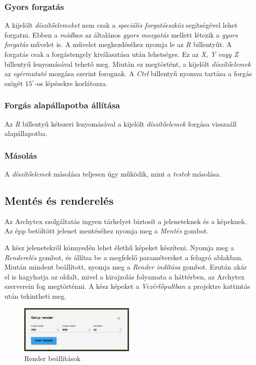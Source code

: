 \subsubsection{Gyors forgatás}

A kijelölt \emph{díszítőelemeket} nem csak a \emph{speciális forgatóeszköz} segítségével lehet
forgatni. Ebben a \emph{módban} az általános \emph{gyors mozgatás} mellett létezik a
\emph{gyors forgatás} művelet is. A művelet megkezdéséhez nyomja le az \emph{R} billentyűt.
A forgatás csak a forgástengely kiválasztása után lehetséges. Ez
az \emph{X, Y vagy Z} billentyű lenyomásával tehető meg. Miután ez megtörtént, a kijelölt
\emph{díszítőelemek} az \emph{egérmutató} mozgása szerint forognak. A \emph{Ctrl} billentyű
nyomva tartása a forgás szögét $15^{\circ}$-os lépésekre korlátozza.

\subsubsection{Forgás alapállapotba állítása}

Az \emph{R} billentyű kétszeri lenyomásával a kijelölt \emph{díszítőelemek} forgása visszaáll
alapállapotba.

\subsubsection{Másolás}

A \emph{díszítőelemek} másolása teljesen úgy működik, mint a \emph{testek} másolása.

\subsection{Mentés és renderelés}

Az Archytex szolgáltatás ingyen tárhelyet biztosít a jeleneteknek és a képeknek. Az épp betöltött
jelenet mentéséhez nyomja meg a \emph{Mentés} gombot.

A kész jelenetekről könnyedén lehet élethű képeket készíteni. Nyomja meg a \emph{Renderelés} gombot,
és állítsa be a megfelelő paramétereket a felugró ablakban. Miután mindent beállított, nyomja meg
a \emph{Render indítása} gombot. Ezután akár el is hagyhatja az oldalt, mivel a kirajzolás
folyamata a háttérben, az Archytex szerverein fog megtörténni. A kész képeket a \emph{Vezérlőpultban} a projektre kattintás után tekintheti
meg.

\begin{figure}[H]
    \centering
    \includegraphics[width=0.5\textwidth]{parts/user-documentation/editor/images/render.png}
    \caption{Render beállítások}
\end{figure}